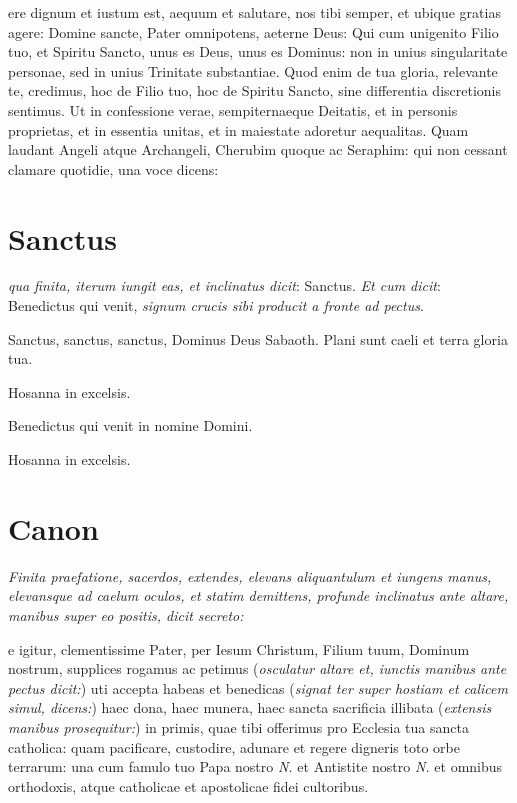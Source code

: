 
ere dignum et iustum est, aequum et salutare, nos tibi semper, et
ubique gratias agere: Domine sancte, Pater omnipotens, aeterne Deus: Qui cum
unigenito Filio tuo, et Spiritu Sancto, unus es Deus, unus es Dominus: non in
unius singularitate personae, sed in unius Trinitate substantiae.  Quod enim de
tua gloria, relevante te, credimus, hoc de Filio tuo, hoc de Spiritu Sancto,
sine differentia discretionis sentimus.  Ut in confessione verae, sempiternaeque
Deitatis, et in personis proprietas, et in essentia unitas, et in maiestate
adoretur aequalitas.  Quam laudant Angeli atque Archangeli, Cherubim quoque ac
Seraphim: qui non cessant clamare quotidie, una voce dicens:

\section{Sanctus}


\textit{qua finita, iterum iungit eas, et inclinatus dicit}: Sanctus.
\textit{Et cum dicit}: Benedictus qui venit, \textit{signum crucis sibi producit
a fronte ad pectus}.

\sinus

{
    \Large\centering
    \par Sanctus, sanctus, sanctus, Dominus Deus Sabaoth.  Plani sunt caeli et
    terra gloria tua.
    \par Hosanna in excelsis.
    \par Bene\cross{}dictus qui venit in nomine Domini.
    \par Hosanna in excelsis.
    \par
}

\section{Canon}

\textit{%
    Finita praefatione, sacerdos, extendes, elevans aliquantulum et iungens
    manus, elevansque ad caelum oculos, et statim demittens, profunde inclinatus
    ante altare, manibus super eo positis, dicit secreto:
}

e igitur, clementissime Pater, per Iesum Christum, Filium tuum,
Dominum nostrum, supplices rogamus ac petimus (\textit{osculatur altare et,
iunctis manibus ante pectus dicit:}) uti accepta habeas et benedicas
(\textit{signat ter super hostiam et calicem simul, dicens:}) haec \cross{}
dona, haec \cross{} munera, haec \cross{} sancta sacrificia illibata
(\textit{extensis manibus prosequitur:}) in primis, quae tibi offerimus pro
Ecclesia tua sancta catholica: quam pacificare, custodire, adunare et regere
digneris toto orbe terrarum: una cum famulo tuo Papa nostro \textit{N.} et
Antistite nostro \textit{N.} et omnibus orthodoxis, atque catholicae et
apostolicae fidei cultoribus.

